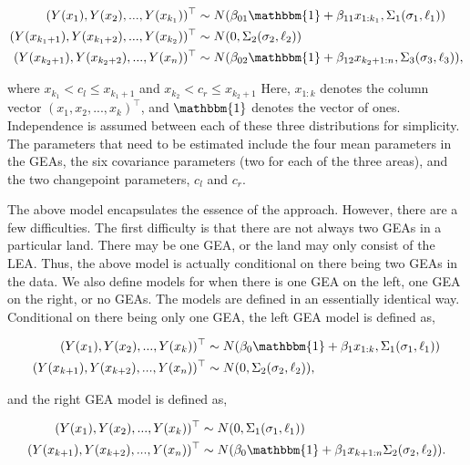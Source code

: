 \documentclass[12pt]{article}
\begin{document}
\begin{align}
(Y(x_1), Y(x_2), ..., Y(x_{k_1}))^{\top} &\sim N(\beta_{01}\mathbbm{1} + \beta_{11} x_{1:k_1}, \Sigma_1(\sigma_1, \ell_1)) \\
(Y(x_{k_1 + 1}), Y(x_{k_1 + 2}), ..., Y(x_{k_2}))^{\top} &\sim N(0, \Sigma_2(\sigma_2, \ell_2)) \\ 
(Y(x_{k_2 + 1}), Y(x_{k_2 + 2}), ..., Y(x_n))^{\top} &\sim N(\beta_{02}\mathbbm{1} + \beta_{12} x_{k_2 + 1:n}, \Sigma_3(\sigma_3, \ell_3)),
\end{align}

\noindent where \(x_{k_1} < c_l \leq x_{k_1 + 1}\) and
\(x_{k_2} < c_r \leq x_{k_2 + 1}\) Here, \(x_{1:k}\) denotes the column
vector \((x_1, x_2, ..., x_k)^\top\), and \(\mathbbm{1}\) denotes the
vector of ones. Independence is assumed between each of these three
distributions for simplicity. The parameters that need to be estimated
include the four mean parameters in the GEAs, the six covariance
parameters (two for each of the three areas), and the two changepoint
parameters, \(c_l\) and \(c_r\).

The above model encapsulates the essence of the approach. However, there
are a few difficulties. The first difficulty is that there are not
always two GEAs in a particular land. There may be one GEA, or the land
may only consist of the LEA. Thus, the above model is actually
conditional on there being two GEAs in the data. We also define models
for when there is one GEA on the left, one GEA on the right, or no GEAs.
The models are defined in an essentially identical way. Conditional on
there being only one GEA, the left GEA model is defined as,

\begin{align}
(Y(x_1), Y(x_2), ..., Y(x_{k}))^{\top} &\sim N(\beta_{0}\mathbbm{1} + \beta_{1} x_{1:k}, \Sigma_1(\sigma_1, \ell_1)) \\
(Y(x_{k + 1}), Y(x_{k + 2}), ..., Y(x_{n}))^{\top} &\sim N(0, \Sigma_2(\sigma_2, \ell_2)),
\end{align}

\noindent and the right GEA model is defined as,

\begin{align}
(Y(x_{1}), Y(x_{2}), ..., Y(x_{k}))^{\top} &\sim N(0, \Sigma_1(\sigma_1, \ell_1)) \\ 
(Y(x_{k + 1}), Y(x_{k + 2}), ..., Y(x_n))^{\top} &\sim N(\beta_{0}\mathbbm{1} + \beta_{1} x_{k + 1:n} \Sigma_2(\sigma_2, \ell_2)).
\end{align}
\end{document}
